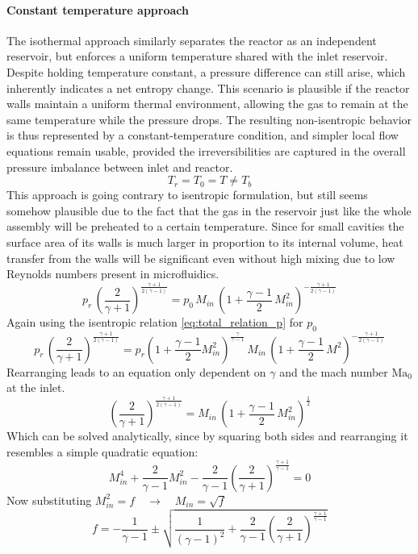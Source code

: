 \paragraph{Constant temperature approach}
	The isothermal approach similarly separates the reactor as an independent reservoir, but enforces a uniform temperature shared with the inlet reservoir.
	Despite holding temperature constant, a pressure difference can still arise, which inherently indicates a net entropy change.
	This scenario is plausible if the reactor walls maintain a uniform thermal environment, allowing the gas to remain at the same temperature while the pressure drops.
	The resulting non-isentropic behavior is thus represented by a constant-temperature condition, and simpler local flow equations remain usable, provided the irreversibilities are captured in the overall pressure imbalance between inlet and reactor. 
	$$
		T_r = T_0 = T \neq T_b
	$$
	This approach is going contrary to isentropic formulation, but still seems somehow plausible due to the fact that the gas in the reservoir just like the whole assembly will be preheated to a certain temperature.
	Since for small cavities the surface area of its walls is much larger in proportion to its internal volume, heat transfer from the walls will be significant even without high mixing due to low Reynolds numbers present in microfluidics.
	$$
		p_r\, \left(\frac{2}{\gamma+1}\right)^{\frac{\gamma+1}{2(\gamma-1)}}
		=  p_0\, M_{in}\,\left(1+\frac{\gamma-1}{2}\,M_{in}^2\right)^{-\frac{\gamma+1}{2(\gamma-1)}}
	$$
	Again using the isentropic relation \eqref{eq:total_relation_p} for $p_0$
	$$
		p_r\, \left(\frac{2}{\gamma+1}\right)^{\frac{\gamma+1}{2(\gamma-1)}}
		=  p_r \left(1 + \frac{\gamma - 1}{2}M_{in}^2 \right)^{\frac{\gamma}{\gamma - 1}}\, M_{in}\,\left(1+\frac{\gamma-1}{2}\,M^2\right)^{-\frac{\gamma+1}{2(\gamma-1)}}
	$$
	Rearranging leads to an equation only dependent on $\gamma$ and the mach number $\mathrm{Ma}_0$ at the inlet.
	$$
		\left(\frac{2}{\gamma+1}\right)^{\frac{\gamma+1}{2(\gamma-1)}}
		=  M_{in}\,\left(1+\frac{\gamma-1}{2}\,M_{in}^2\right)^{\frac{1}{2}}
	$$
	Which can be solved analytically, since by squaring both sides and rearranging it resembles a simple quadratic equation:
	\begin{equation}
		M_{in}^4 + \frac{2}{\gamma - 1}M_{in}^2 - \frac{2}{\gamma -1}\left(\frac{2}{\gamma + 1}\right)^{\frac{\gamma + 1}{\gamma - 1}} = 0
	\end{equation}
	Now substituting $M_{in}^2 = f \quad \to \quad M_{in} = \sqrt{f}$
	\begin{equation}
		f = -\frac{1}{\gamma - 1} \pm \sqrt{\frac{1}{(\gamma - 1)^2}
		+ \frac{2}{\gamma -1}\left(\frac{2}{\gamma + 1}\right)^{\frac{\gamma + 1}{\gamma - 1}}}
	\end{equation}
